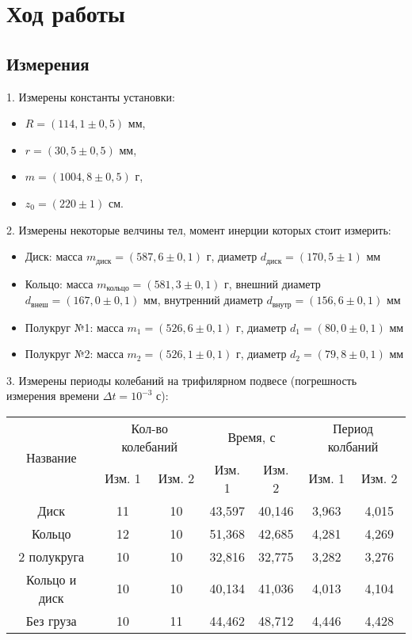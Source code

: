 \section{Ход работы}
\subsection{Измерения}

1. Измерены константы установки:

\begin{itemize}
    \item $R = (114,1 \pm 0,5)$ мм,
    \item $r = \left(30,5 \pm 0,5\right)$ мм,
    \item $m = \left(1004,8 \pm 0,5\right)$ г,
    \item $z_0 = \left(220 \pm 1\right)$ см.
\end{itemize}

2. Измерены некоторые велчины тел, момент инерции которых стоит
измерить:
\begin{itemize}
    \item Диск: масса $m_\text{диск} = \left(587,6 \pm 0,1\right)$ г, диаметр $d_\text{диск} = (170,5 \pm 1)$ мм
    \item Кольцо: масса $m_\text{кольцо} = \left(581,3 \pm 0,1\right)$ г, внешний диаметр $d_\text{внеш} = \left(167,0 \pm 0,1\right)$ мм, внутренний диаметр $d_\text{внутр} = \left(156,6 \pm 0,1\right)$ мм
    \item Полукруг №1: масса $m_1 = \left(526,6 \pm 0,1\right)$ г, диаметр $d_1 = \left(80,0 \pm 0,1\right)$ мм
    \item Полукруг №2: масса $m_2 = \left(526,1 \pm 0,1\right)$ г, диаметр $d_2 = \left(79,8 \pm 0,1\right)$ мм
\end{itemize}

3. Измерены периоды колебаний на трифилярном подвесе
(погрешность измерения времени $\Delta t = 10^{-3}$ с):
\begin{center}
\begin{tabular}{|c|c|c|c|c|c|c|}
    \hline
    \multirow{2}{*}{Название} & \multicolumn{2}{c|}{Кол-во колебаний} & \multicolumn{2}{c|}{Время, с} & \multicolumn{2}{c|}{Период колбаний}\\
    \cline{2-7}
    & Изм. 1& Изм. 2& Изм. 1& Изм. 2& Изм. 1& Изм. 2\\
    \hline
    Диск & 11& 10 & 43,597 & 40,146 & 3,963 & 4,015\\
    \hline
    Кольцо &12&10&51,368&42,685&4,281&4,269\\
    \hline
    2 полукруга&10&10&32,816&32,775&3,282&3,276\\
    \hline
    Кольцо и диск&10&10&40,134&41,036&4,013&4,104\\
    \hline
    Без груза&10&11&44,462&48,712&4,446&4,428\\
    \hline
\end{tabular}
\end{center}


